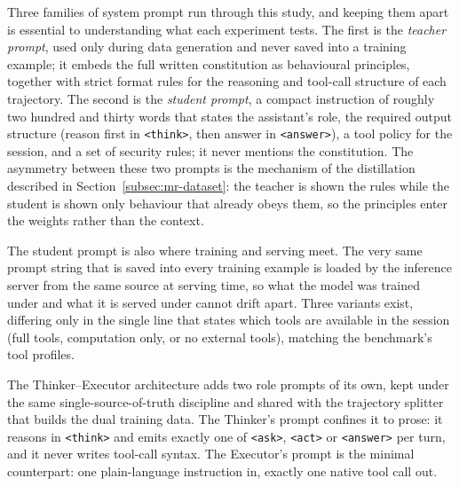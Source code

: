 Three families of system prompt run through this study, and keeping them apart is essential to understanding what each experiment tests. The first is the \emph{teacher prompt}, used only during data generation and never saved into a training example; it embeds the full written constitution as behavioural principles, together with strict format rules for the reasoning and tool-call structure of each trajectory. The second is the \emph{student prompt}, a compact instruction of roughly two hundred and thirty words that states the assistant's role, the required output structure (reason first in \texttt{<think>}, then answer in \texttt{<answer>}), a tool policy for the session, and a set of security rules; it never mentions the constitution. %
The asymmetry between these two prompts is the mechanism of the distillation described in Section~\ref{subsec:mr-dataset}: the teacher is shown the rules while the student is shown only behaviour that already obeys them, so the principles enter the weights rather than the context.

The student prompt is also where training and serving meet. The very same prompt string that is saved into every training example is loaded by the inference server from the same source at serving time, so what the model was trained under and what it is served under cannot drift apart. Three variants exist, differing only in the single line that states which tools are available in the session (full tools, computation only, or no external tools), matching the benchmark's tool profiles.

The Thinker--Executor architecture adds two role prompts of its own, kept under the same single-source-of-truth discipline and shared with the trajectory splitter that builds the dual training data. The Thinker's prompt confines it to prose: it reasons in \texttt{<think>} and emits exactly one of \texttt{<ask>}, \texttt{<act>} or \texttt{<answer>} per turn, and it never writes tool-call syntax. The Executor's prompt is the minimal counterpart: one plain-language instruction in, exactly one native tool call out.

